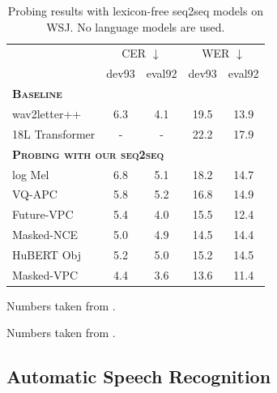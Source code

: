 %
%
%
%
%
%
%
%
%
%
%
%
%
%
%
%
%
%
%
%
%
%
%
%
%
%
%
%
%
%

\begin{table}[t]
  \caption{Probing results with lexicon-free seq2seq models on WSJ.
    No language models are used.}
  \label{tab:downstream_asr}
  \centering
  \begin{threeparttable}
  \footnotesize
  \addtolength{\tabcolsep}{-0.11em}
  \begin{tabularx}{0.94\linewidth}{lcccc}
    \toprule
      &\multicolumn{2}{c}{CER $\downarrow$} &\multicolumn{2}{c}{WER $\downarrow$}\\
            &dev93 &eval92  &dev93 &eval92\\[1pt]
    \midrule
    \multicolumn{4}{l}{\textbf{\textsc{Baseline}}}  \\[2pt]
    wav2letter++ \tnote{\dag}   &6.3   &4.1    &19.5     &13.9\\
    18L Transformer\tnote{\ddag}&- &- &22.2     &17.9\\
    \midrule                                                                                                                 
    \multicolumn{4}{l}{\textbf{\textsc{Probing with our seq2seq}}}  \\[2pt]
    log Mel     &6.8   &5.1  &18.2      &14.7 \\
    VQ-APC      &5.8  &5.2    &16.8      &14.9  \\
    Future-VPC   &5.4  &4.0    &15.5      &12.4  \\
    Masked-NCE   &5.0  &4.9    &14.5      &14.4  \\
    HuBERT Obj     &5.2  &5.0    &15.2      &14.5  \\
    Masked-VPC   &4.4  &3.6    &13.6      &11.4  \\
    \bottomrule
  \end{tabularx}
  \begin{tablenotes}\footnotesize
  \item[\dag] Numbers taken from \citet{baevski2019vq}.
  \item[\ddag] Numbers taken from \citet{higuchi2020mask}. 
  \end{tablenotes}
  \end{threeparttable}
\end{table}

\subsection{Automatic Speech Recognition}

